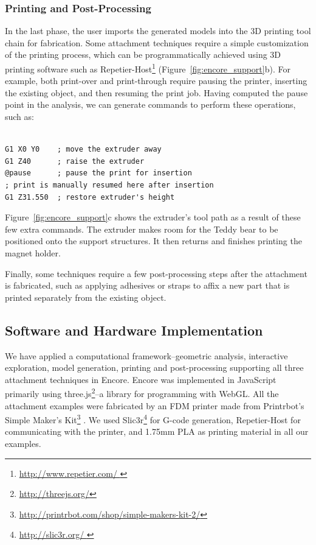 \subsubsection{Printing and Post-Processing}
In the last phase, the user imports the generated models into the 3D printing tool chain for fabrication. Some attachment techniques require a simple customization of the printing process, which can be programmatically achieved using 3D printing software such as Repetier-Host\footnote{\url{http://www.repetier.com/
 }} (Figure~\ref{fig:encore_support}b). For example, both print-over and print-through require pausing the printer, inserting the existing object, and then resuming the print job. Having computed the pause point in the analysis, we can generate commands to perform these operations, such as:

\begin{verbatim}

G1 X0 Y0	; move the extruder away
G1 Z40		; raise the extruder
@pause		; pause the print for insertion
; print is manually resumed here after insertion
G1 Z31.550	; restore extruder's height

\end{verbatim}

Figure~\ref{fig:encore_support}c shows the extruder's tool path as a result of these few extra commands. The extruder makes room for the Teddy bear to be positioned onto the support structures. It then returns and finishes printing the magnet holder.

Finally, some techniques require a few post-processing steps after the attachment is fabricated, such as applying adhesives or straps to affix a new part that is printed separately from the existing object.

\subsection{Software and Hardware Implementation}
We have applied a computational framework--geometric analysis, interactive exploration, model generation, printing and post-processing supporting all three attachment techniques in Encore. Encore was implemented in JavaScript primarily using three.js\footnote{\url{http://threejs.org/}}--a library for programming with WebGL. All the attachment examples were fabricated by an FDM printer made from Printrbot's Simple Maker's Kit\footnote{\url{http://printrbot.com/shop/simple-makers-kit-2/}} . We used Slic3r\footnote{\url{http://slic3r.org/
 }} for G-code generation, Repetier-Host for communicating with the printer, and 1.75mm PLA as printing material in all our examples.

